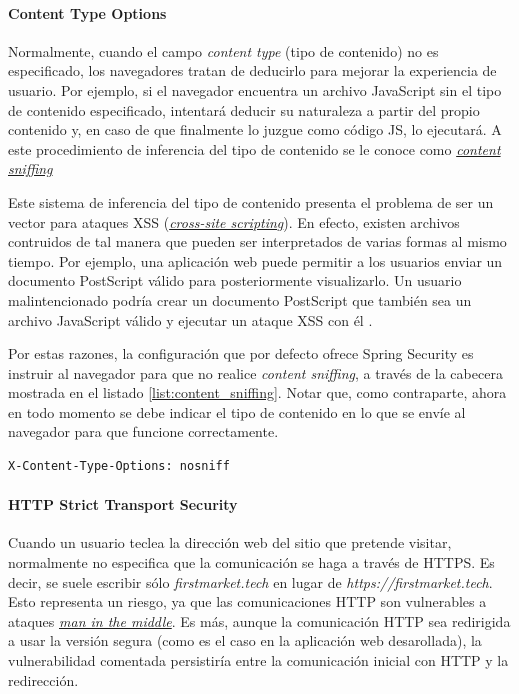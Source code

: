 \documentclass[a4paper,12pt,twoside,openright]{report}
\begin{document}
	\paragraph{Content Type Options}
	Normalmente, cuando el campo \emph{content type} (tipo de contenido) no es especificado, los navegadores tratan de deducirlo para mejorar la experiencia de usuario. Por ejemplo, si el navegador encuentra un archivo JavaScript sin el tipo de contenido especificado, intentará deducir su naturaleza a partir del propio contenido y, en caso de que finalmente lo juzgue como código JS, lo ejecutará. A este procedimiento de inferencia del tipo de contenido se le conoce como \href{https://en.wikipedia.org/wiki/Content_sniffing}{\emph{content sniffing}}
	
	Este sistema de inferencia del tipo de contenido presenta el problema de ser un vector para ataques XSS (\href{https://owasp.org/www-community/attacks/xss/}{\emph{cross-site scripting}}). En efecto, existen archivos contruidos de tal manera que pueden ser interpretados de varias formas al mismo tiempo. Por ejemplo, una aplicación web puede permitir a los usuarios enviar un documento PostScript válido para posteriormente visualizarlo. Un usuario malintencionado podría crear un documento PostScript que también sea un archivo JavaScript válido y ejecutar un ataque XSS con él \cite{Alex2020}.
	
	Por estas razones, la configuración que por defecto ofrece Spring Security es instruir al navegador para que no realice \emph{content sniffing}, a través de la cabecera mostrada en el listado \ref{list:content_sniffing}. Notar que, como contraparte, ahora en todo momento se debe indicar el tipo de contenido en lo que se envíe al navegador para que funcione correctamente.
	\\
	
	\begin{lstlisting}[caption=Cabecera para impedir el \emph{content sniffing}, label=list:content_sniffing]
	X-Content-Type-Options: nosniff
	\end{lstlisting}
	
	\paragraph{HTTP Strict Transport Security}
	Cuando un usuario teclea la dirección web del sitio que pretende visitar, normalmente no especifica que la comunicación se haga a través de HTTPS. Es decir, se suele escribir sólo \emph{firstmarket.tech} en lugar de \emph{https://firstmarket.tech}. Esto representa un riesgo, ya que las comunicaciones HTTP son vulnerables a ataques \href{https://en.wikipedia.org/wiki/Man-in-the-middle_attack}{\emph{man in the middle}}. Es más, aunque la comunicación HTTP sea redirigida a usar la versión segura (como es el caso en la aplicación web desarollada), la vulnerabilidad comentada persistiría entre la comunicación inicial con HTTP y la redirección.
	
\end{document}
